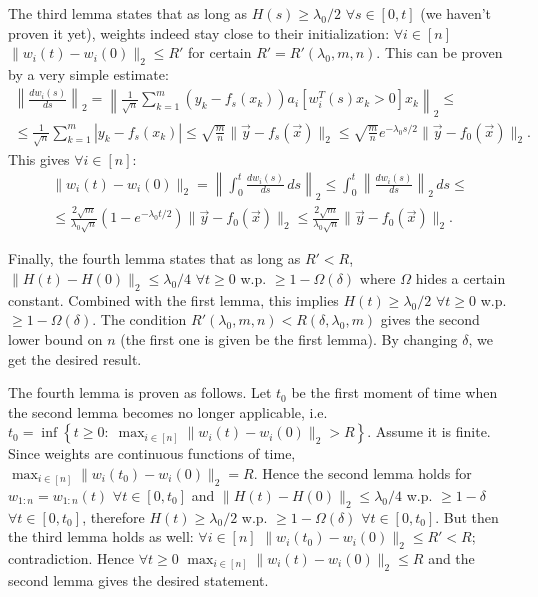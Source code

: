 \documentclass{article}
\begin{document}
    The third lemma states that as long as $H(s) \geq \lambda_0/2$ $\forall s \in [0,t]$ (we haven't proven it yet), weights indeed stay close to their initialization: $\forall i \in [n]$ $\|w_i(t) - w_i(0)\|_2 \leq R'$ for certain $R' = R'(\lambda_0,m,n)$.
    This can be proven by a very simple estimate:
    \begin{multline}
        \left\|\frac{dw_i(s)}{ds}\right\|_2 =
        \left\|\frac{1}{\sqrt{n}} \sum_{k=1}^m (y_k - f_s(x_k)) a_i [w_i^T(s) x_k > 0] x_k\right\|_2 \leq
        \\\leq
        \frac{1}{\sqrt{n}} \sum_{k=1}^m |y_k - f_s(x_k)| \leq
        \sqrt{\frac{m}{n}} \|\vec y - f_s(\vec x)\|_2 \leq
        \sqrt{\frac{m}{n}} e^{-\lambda_0 s / 2} \|\vec y - f_0(\vec x)\|_2.
    \end{multline}
    This gives $\forall i \in [n]$:
    \begin{multline}
        \| w_i(t) - w_i(0) \|_2 =
        \left\|\int_0^t \frac{dw_i(s)}{ds} \, ds\right\|_2 \leq
        \int_0^t \left\|\frac{dw_i(s)}{ds}\right\|_2 \, ds \leq
        \\\leq
        \frac{2 \sqrt{m}}{\lambda_0 \sqrt{n}} \left(1 - e^{-\lambda_0 t / 2}\right) \|\vec y - f_0(\vec x)\|_2 \leq
        \frac{2 \sqrt{m}}{\lambda_0 \sqrt{n}} \|\vec y - f_0(\vec x)\|_2.
    \end{multline}

    Finally, the fourth lemma states that as long as $R' < R$, $\| H(t) - H(0) \|_2 \leq \lambda_0/4$ $\forall t \geq 0$ w.p. $\geq 1-\Omega(\delta)$ where $\Omega$ hides a certain constant.
    Combined with the first lemma, this implies $H(t) \geq \lambda_0/2$ $\forall t \geq 0$ w.p. $\geq 1-\Omega(\delta)$.
    The condition $R'(\lambda_0,m,n) < R(\delta,\lambda_0,m)$ gives the second lower bound on $n$ (the first one is given be the first lemma).
    By changing $\delta$, we get the desired result.

    The fourth lemma is proven as follows.
    Let $t_0$ be the first moment of time when the second lemma becomes no longer applicable, i.e. $t_0 = \inf\left\{t \geq 0: \; \max_{i \in [n]} \| w_i(t) - w_i(0) \|_2 > R\right\}$.
    Assume it is finite.
    Since weights are continuous functions of time, $\max_{i \in [n]} \| w_i(t_0) - w_i(0) \|_2 = R$.
    Hence the second lemma holds for $w_{1:n} = w_{1:n}(t)$ $\forall t \in [0,t_0]$ and $\| H(t) - H(0) \|_2 \leq \lambda_0/4$ w.p. $\geq 1-\delta$ $\forall t \in [0,t_0]$, therefore $H(t) \geq \lambda_0/2$ w.p. $\geq 1-\Omega(\delta)$ $\forall t \in [0,t_0]$.
    But then the third lemma holds as well: $\forall i \in [n]$ $\|w_i(t_0) - w_i(0)\|_2 \leq R' < R$; contradiction.
    Hence $\forall t \geq 0$ $\max_{i \in [n]} \| w_i(t) - w_i(0) \|_2 \leq R$ and the second lemma gives the desired statement.
\end{document}
